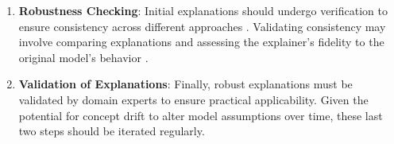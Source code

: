 \begin{enumerate}
    \item \textbf{Robustness Checking}: Initial explanations should undergo verification to ensure consistency across different approaches . Validating consistency may involve comparing explanations and assessing the explainer's fidelity to the original model's behavior .

    \item \textbf{Validation of Explanations}: Finally, robust explanations must be validated by domain experts to ensure practical applicability. Given the potential for concept drift to alter model assumptions over time, these last two steps should be iterated regularly.
\end{enumerate}

